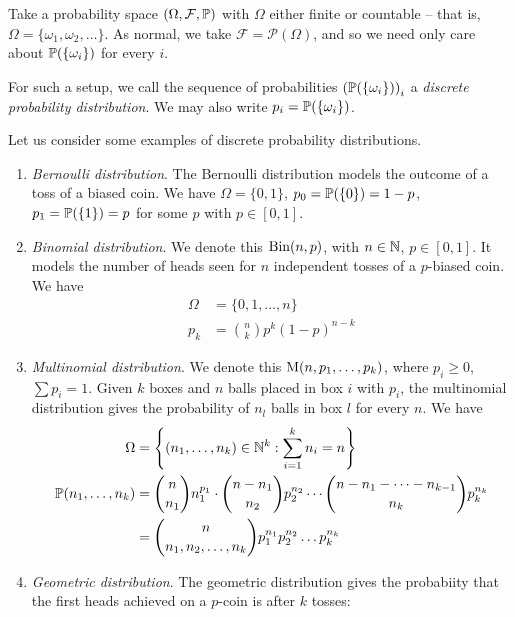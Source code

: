 \documentclass{../../template/note}
\begin{document}
    Take a probability space \((\Omega, \mathcal F, \mathbb P)\) with \(\Omega\) either finite or countable -- that is, \(\Omega = \{\omega_1, \omega_2, \dots\}\). As normal, we take \(\mathcal F = \mathcal P(\Omega)\), and so we need only care about \(\mathbb P(\{\omega_i\})\) for every \(i\).

    \begin{definition}
        For such a setup, we call the sequence of probabilities \(\left(\mathbb P(\{\omega_i\})\right)_i\) a \emph{discrete probability distribution}. We may also write \(p_i = \mathbb P(\{\omega_i\})\).
    \end{definition}

    Let us consider some examples of discrete probability distributions.
    
    \begin{enumerate}[label=\protect\circled{\arabic*}]
        \item \emph{Bernoulli distribution}. The Bernoulli distribution models the outcome of a toss of a biased coin. We have \(\Omega = \{0, 1\}\), \(p_0 = \mathbb P(\{0\}) = 1 - p\), \(p_1 = \mathbb P(\{1\}) = p\) for some \(p\) with \(p \in [0, 1]\).
        \item \emph{Binomial distribution}. We denote this \(\operatorname{Bin}(n, p)\), with \(n \in \mathbb N\), \(p \in [0, 1]\). It models the number of heads seen for \(n\) independent tosses of a \(p\)-biased coin. We have
        \begin{align*}
            \Omega &= \{0, 1, \dots, n\} \\
            p_k &= \binom n k p^k (1-p)^{n-k} 
        \end{align*}
        \item \emph{Multinomial distribution}. We denote this \(\operatorname{M}(n, p_1, \dots, p_k)\), where \(p_i \geq 0\), \(\sum p_i = 1\). Given \(k\) boxes and \(n\) balls placed in box \(i\) with \(p_i\), the multinomial distribution gives the probability of \(n_l\) balls in box \(l\) for every \(n\). We have
        \begin{align*}
            \Omega &= \left\{(n_1, \dots, n_k) \in \mathbb N^k: \sum_{i=1}^k n_i = n\right\} \\
            \mathbb P(n_1, \dots, n_k) &= \binom n {n_1} n_1^{p_1} \cdot \binom {n-n_1}{n_2} p_2^{n_2} \cdots \binom{n-n_1-\dots-n_{k-1}}{n_k} p_k^{n_k} \\
            &= \binom n {n_1, n_2, \dots, n_k} p_1^{n_1} p_2^{n_2} \dots p_k^{n_k}
        \end{align*}
        \item \emph{Geometric distribution}. The geometric distribution gives the probabiity that the first heads achieved on a \(p\)-coin is after \(k\) tosses:

\end{enumerate}
\end{document}
